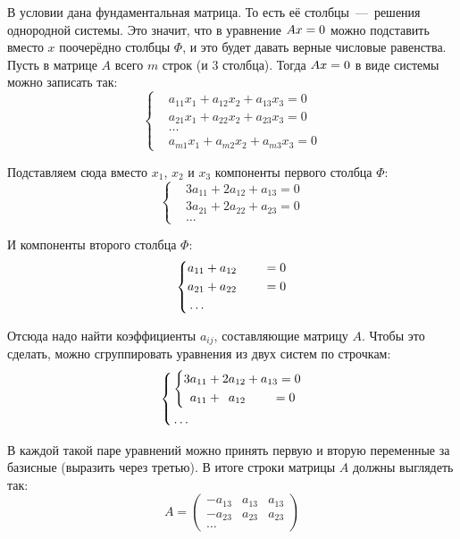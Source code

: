 \documentclass[a4paper,12pt]{article}
\begin{document}
\begin{solution}
    В условии дана фундаментальная матрица.
    То есть её столбцы~---~решения однородной системы.
    Это значит, что в уравнение $Ax \hm= 0$ можно подставить вместо $x$ поочерёдно столбцы $\Phi$, и это будет давать верные числовые равенства.
    Пусть в матрице $A$ всего $m$ строк (и $3$ столбца).
    Тогда $Ax \hm= 0$ в виде системы можно записать так:
    \[
      \left\{
        \begin{aligned}
          &a_{11} x_1 + a_{12} x_2 + a_{13} x_3 = 0\\
          &a_{21} x_1 + a_{22} x_2 + a_{23} x_3 = 0\\
          &\ldots\\
          &a_{m1} x_1 + a_{m2} x_2 + a_{m3} x_3 = 0
        \end{aligned}
      \right.
    \]
    
    Подставляем сюда вместо $x_1$, $x_2$ и $x_3$ компоненты первого столбца $\Phi$:
    \[
      \left\{
        \begin{aligned}
          &3 a_{11} + 2 a_{12} + a_{13} = 0\\
          &3 a_{21} + 2 a_{22} + a_{23} = 0\\
          &\ldots
        \end{aligned}
      \right.
    \]
    
    И компоненты второго столбца $\Phi$:
    \[
      \left\{
        \begin{aligned}
          &a_{11} + a_{12} \hphantom{+ a_{13}} = 0\\
          &a_{21} + a_{22} \hphantom{+ a_{23}} = 0\\
          &\ldots
        \end{aligned}
      \right.
    \]
    
    Отсюда надо найти коэффициенты $a_{ij}$, составляющие матрицу $A$.
    Чтобы это сделать, можно сгруппировать уравнения из двух систем по строчкам:
    \[
      \left\{
        \begin{aligned}
          &\left\{
            \begin{aligned}
              &3 a_{11} + 2 a_{12} + a_{13} = 0\\
              &\hphantom{3}a_{11} + \hphantom{2}a_{12} \hphantom{+ a_{13}} = 0
            \end{aligned}
          \right.\\
          &\ldots
        \end{aligned}
      \right.
    \]
    
    В каждой такой паре уравнений можно принять первую и вторую переменные за базисные (выразить через третью).
    В итоге строки матрицы $A$ должны выглядеть так:
    \[
      A = \begin{pmatrix}
        -a_{13} & a_{13} & a_{13}\\
        -a_{23} & a_{23} & a_{23}\\
        \ldots
      \end{pmatrix}
    \]
    

\end{solution}
\end{document}
